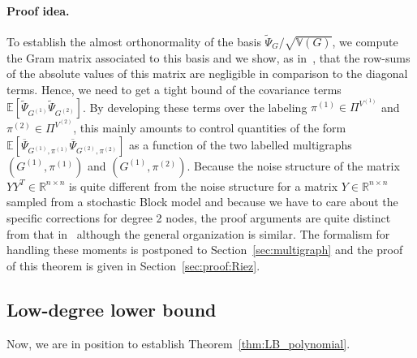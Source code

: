 \documentclass{article}
\begin{document}
\paragraph{Proof idea.} To establish the almost orthonormality of the basis $\widetilde{\Psi}_G/\sqrt{\mathbb V(G) }$, we compute the Gram matrix associated to this basis and we show, as in~\cite{CGGV25}, that the row-sums of the absolute values of this matrix are negligible in comparison to the diagonal terms. Hence, we need to get a tight bound of the covariance terms $\mathbb{E}[\tilde{\Psi}_{G^{(1)}}\tilde{\Psi}_{G^{(2)}}]$. By developing these terms over the labeling $\pi^{(1)}\in \Pi^{V^{(1)}}$ and $\pi^{(2)}\in \Pi^{V^{(2)}}$, this mainly amounts to control quantities of the form $\mathbb{E}[\overline{\Psi}_{G^{(1)},\pi^{(1)}}\overline{\Psi}_{G^{(2)},\pi^{(2)}}]$ as a function of the two labelled multigraphs $(G^{(1)},\pi^{(1)})$ and  $(G^{(1)},\pi^{(2)})$. Because the noise structure of the matrix $YY^{T}\in \mathbb{R}^{n\times n}$ is quite different from the noise structure for a matrix $Y\in \mathbb{R}^{n\times n}$ sampled from a stochastic Block model and because we have to care about the specific corrections for degree 2 nodes, the proof arguments are quite distinct from that in~\cite{CGGV25} although the general organization is similar. The formalism for handling these moments is postponed to Section~\ref{sec:multigraph} and the proof of this theorem is given in Section~\ref{sec:proof:Riez}.









        \subsection{Low-degree lower bound}\label{sec:lower_bound}
        

Now, we are in position to establish Theorem~\ref{thm:LB_polynomial}. 
\end{document}
